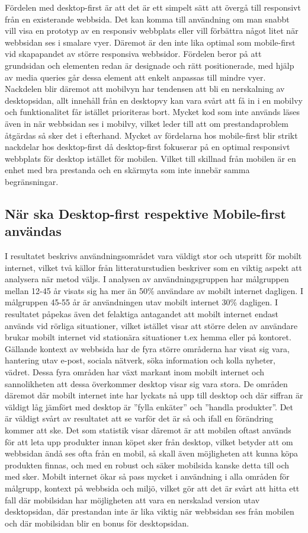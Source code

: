 \documentclass[11pt]{article}
\begin{document}
Fördelen med desktop-first är att det är ett simpelt sätt att övergå till responsivt från en existerande webbsida. Det kan komma till användning om man snabbt vill visa en prototyp av en responsiv webbplats eller vill förbättra något litet när webbsidan ses i smalare vyer. Däremot är den inte lika optimal som mobile-first vid skapapandet av större responsiva webbsidor. Fördelen beror på att grundsidan och elementen redan är designade och rätt positionerade, med hjälp av media queries går dessa element att enkelt anpassas till mindre vyer. Nackdelen blir däremot att mobilvyn har tendensen att bli en nerskalning av desktopsidan, allt innehåll från en desktopvy kan vara svårt att få in i en mobilvy och funktionalitet får istället prioriteras bort. Mycket kod som inte används läses även in när webbsidan ses i mobilvy, vilket leder till att om prestandaproblem åtgärdas så sker det i efterhand. Mycket av fördelarna hos mobile-first blir strikt nackdelar hos desktop-first då desktop-first fokuserar på en optimal responsivt webbplats för desktop istället för mobilen. 
Vilket till skillnad från mobilen är en enhet med bra prestanda och en skärmyta som inte innebär samma begränsningar.

\subsection{När ska Desktop-first respektive Mobile-first användas}
I resultatet beskrivs användningsområdet vara väldigt stor och utspritt för mobilt internet, vilket två källor från litteraturstudien beskriver som en viktig aspekt att analysera när metod väljs. I analysen av användningsgruppen har målgruppen mellan 12-45 år visats sig ha mer än 50\% användare av mobilt internet dagligen. I målgruppen 45-55 år är användningen utav mobilt internet 30\% dagligen. I resultatet påpekas även det felaktiga antagandet att mobilt internet endast används vid rörliga situationer, vilket istället visar att större delen av användare brukar mobilt internet vid stationära situationer t.ex hemma eller på kontoret. Gällande kontext av webbsida har de fyra större områderna har visat sig vara, hantering utav e-post, sociala nätverk, söka information och kolla nyheter, vädret.  Dessa fyra områden har växt markant inom mobilt internet och sannolikheten att dessa överkommer desktop visar sig vara stora. De områden däremot där mobilt internet inte har lyckats nå upp till desktop och där siffran är väldigt låg jämfört med desktop är ”fylla enkäter” och ”handla produkter”. Det är väldigt svårt av resultatet att se varför det är så och ifall en förändring kommer att ske. Det som statistik visar däremot är att mobilen oftast används för att leta upp produkter innan köpet sker från desktop, vilket betyder att om webbsidan ändå ses ofta från en mobil, så skall även möjligheten att kunna köpa produkten finnas, och med en robust och säker mobilsida kanske detta till och med sker. Mobilt internet ökar så pass mycket i användning i alla områden för målgrupp, kontext på webbsida och miljö, vilket gör att det är svårt att hitta ett fall där mobilsidan har möjligheten att vara en nerskalad version utav desktopsidan, där prestandan inte är lika viktig när webbsidan ses från mobilen och där mobilsidan blir en bonus för desktopsidan.
\end{document}
